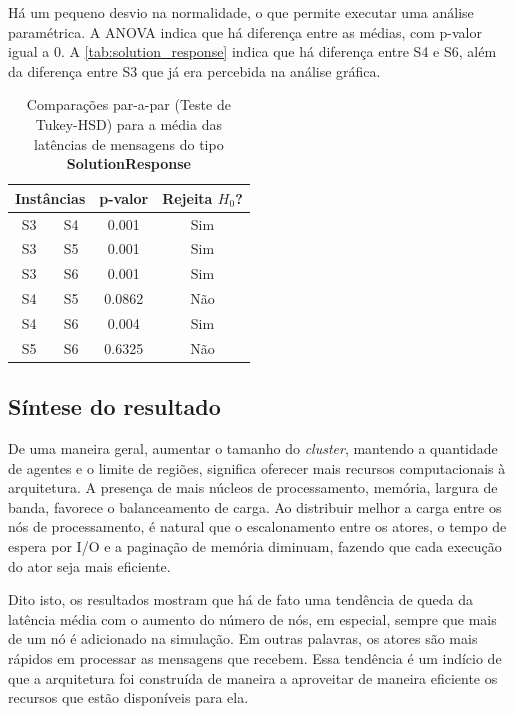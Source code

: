 Há um pequeno desvio na normalidade, o que permite executar uma análise paramétrica. A ANOVA indica que há diferença entre as médias, com p-valor igual a $0$. A \autoref{tab:solution_response} indica que há diferença entre S4 e S6, além da diferença entre S3 que já era percebida na análise gráfica. 

\begin{table}[ht!]
    \centering
    \caption{Comparações par-a-par (Teste de Tukey-HSD) para a média das latências de mensagens do tipo \textbf{SolutionResponse}}
    \begin{tabular}{cccc}
    \toprule
    \multicolumn{2}{c}{\textbf{Instâncias}} & \textbf{p-valor} & \textbf{Rejeita $H_0$?}\\
    \midrule
    S3  &  S4 & 0.001   & Sim  \\
    S3  &  S5 & 0.001   & Sim  \\
    S3  &  S6 & 0.001   & Sim  \\
    S4  &  S5 &  0.0862 & Não \\
    S4  &  S6 &   0.004 & Sim  \\
    S5  &  S6 &  0.6325 & Não \\
     \bottomrule
    \end{tabular}
    \label{tab:solution_response}
\end{table}

\subsection{Síntese do resultado}
\label{sec:sintese}

De uma maneira geral, aumentar o tamanho do \textit{cluster}, mantendo a quantidade de agentes e o limite de regiões, significa oferecer mais recursos computacionais à arquitetura. A presença de mais núcleos de processamento, memória, largura de banda, favorece o balanceamento de carga. Ao distribuir melhor a carga entre os nós de processamento, é natural que o  escalonamento entre os atores, o tempo de espera por I/O e a paginação de memória diminuam, fazendo que cada execução do ator seja mais eficiente.

Dito isto, os resultados mostram que há de fato uma tendência de queda da latência média com o aumento do número de nós, em especial, sempre que mais de um nó é adicionado na simulação. Em outras palavras, os atores são mais rápidos em processar as mensagens que recebem. Essa tendência é um indício de que a arquitetura foi construída de maneira a aproveitar de maneira eficiente os recursos que estão disponíveis para ela. 


